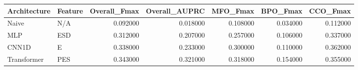 \begin{tabular}{llrrrrr}
\toprule
Architecture & Feature & Overall_Fmax & Overall_AUPRC & MFO_Fmax & BPO_Fmax & CCO_Fmax \\
\midrule
Naive & N/A & 0.092000 & 0.018000 & 0.108000 & 0.034000 & 0.112000 \\
MLP & ESD & 0.312000 & 0.207000 & 0.257000 & 0.106000 & 0.337000 \\
CNN1D & E & 0.338000 & 0.233000 & 0.300000 & 0.110000 & 0.362000 \\
Transformer & PES & 0.343000 & 0.321000 & 0.318000 & 0.154000 & 0.355000 \\
\bottomrule
\end{tabular}
